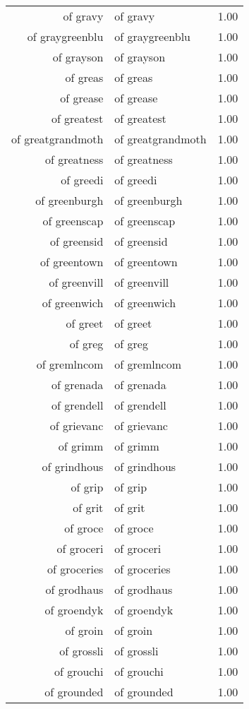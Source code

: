 \begin{table}[ht]
\begin{tabular}{rlr}
  of gravy & of gravy & 1.00 \\ 
  of graygreenblu & of graygreenblu & 1.00 \\ 
  of grayson & of grayson & 1.00 \\ 
  of greas & of greas & 1.00 \\ 
  of grease & of grease & 1.00 \\ 
  of greatest & of greatest & 1.00 \\ 
  of greatgrandmoth & of greatgrandmoth & 1.00 \\ 
  of greatness & of greatness & 1.00 \\ 
  of greedi & of greedi & 1.00 \\ 
  of greenburgh & of greenburgh & 1.00 \\ 
  of greenscap & of greenscap & 1.00 \\ 
  of greensid & of greensid & 1.00 \\ 
  of greentown & of greentown & 1.00 \\ 
  of greenvill & of greenvill & 1.00 \\ 
  of greenwich & of greenwich & 1.00 \\ 
  of greet & of greet & 1.00 \\ 
  of greg & of greg & 1.00 \\ 
  of gremlncom & of gremlncom & 1.00 \\ 
  of grenada & of grenada & 1.00 \\ 
  of grendell & of grendell & 1.00 \\ 
  of grievanc & of grievanc & 1.00 \\ 
  of grimm & of grimm & 1.00 \\ 
  of grindhous & of grindhous & 1.00 \\ 
  of grip & of grip & 1.00 \\ 
  of grit & of grit & 1.00 \\ 
  of groce & of groce & 1.00 \\ 
  of groceri & of groceri & 1.00 \\ 
  of groceries & of groceries & 1.00 \\ 
  of grodhaus & of grodhaus & 1.00 \\ 
  of groendyk & of groendyk & 1.00 \\ 
  of groin & of groin & 1.00 \\ 
  of grossli & of grossli & 1.00 \\ 
  of grouchi & of grouchi & 1.00 \\ 
  of grounded & of grounded & 1.00 \\ 

\end{tabular}
\end{table}

